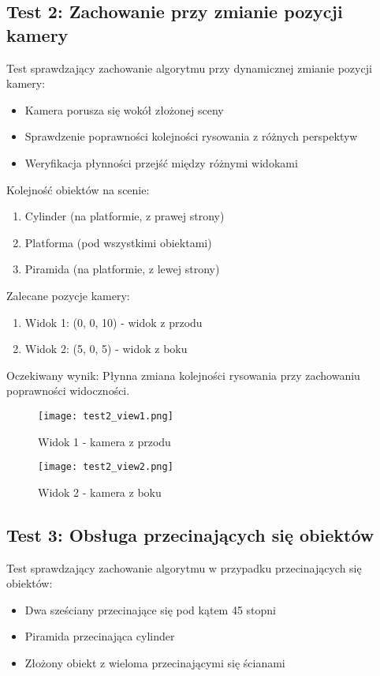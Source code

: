\documentclass[a4paper,12pt]{article}
\begin{document}
\subsection{Test 2: Zachowanie przy zmianie pozycji kamery}
Test sprawdzający zachowanie algorytmu przy dynamicznej zmianie pozycji kamery:
\begin{itemize}
    \item Kamera porusza się wokół złożonej sceny
    \item Sprawdzenie poprawności kolejności rysowania z różnych perspektyw
    \item Weryfikacja płynności przejść między różnymi widokami
\end{itemize}

Kolejność obiektów na scenie:
\begin{enumerate}
    \item Cylinder (na platformie, z prawej strony)
    \item Platforma (pod wszystkimi obiektami)
    \item Piramida (na platformie, z lewej strony)
\end{enumerate}

Zalecane pozycje kamery:
\begin{enumerate}
    \item Widok 1: (0, 0, 10) - widok z przodu
    \item Widok 2: (5, 0, 5) - widok z boku
\end{enumerate}

Oczekiwany wynik: Płynna zmiana kolejności rysowania przy zachowaniu poprawności widoczności.

\begin{figure}[h]
    \centering
    \begin{minipage}{0.48\textwidth}
        \centering
        \texttt{[image: test2\_view1.png]}
        \caption{Widok 1 - kamera z przodu}
    \end{minipage}
    \hfill
    \begin{minipage}{0.48\textwidth}
        \centering
        \texttt{[image: test2\_view2.png]}
        \caption{Widok 2 - kamera z boku}
    \end{minipage}
\end{figure}

\subsection{Test 3: Obsługa przecinających się obiektów}
Test sprawdzający zachowanie algorytmu w przypadku przecinających się obiektów:
\begin{itemize}
    \item Dwa sześciany przecinające się pod kątem 45 stopni
    \item Piramida przecinająca cylinder
    \item Złożony obiekt z wieloma przecinającymi się ścianami
\end{itemize}
\end{document}
